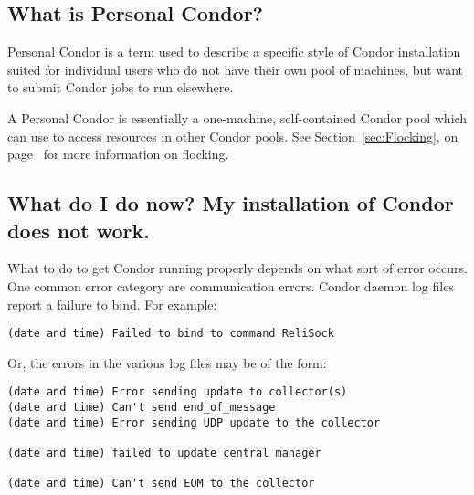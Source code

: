 %

\subsection*{What is Personal Condor?}

Personal Condor is a term used to describe a specific style of Condor
installation suited for individual users who do not have their own
pool of machines, but want to submit Condor jobs to run elsewhere.

A Personal Condor is essentially a one-machine, self-contained Condor
pool which can use  to access resources in other Condor
pools.
See Section~\ref{sec:Flocking}, on page~\pageref{sec:Flocking} for
more information on flocking.


\subsection*{What do I do now? My installation of Condor does not work.}

What to do to get Condor running properly depends on what sort of
error occurs. 
One common error category are communication errors.
Condor daemon log files report a failure to bind.
For example:

\begin{verbatim}
(date and time) Failed to bind to command ReliSock
\end{verbatim}

Or, the errors in the various log files may be of the form:

\begin{verbatim}
(date and time) Error sending update to collector(s)
(date and time) Can't send end_of_message
(date and time) Error sending UDP update to the collector

(date and time) failed to update central manager

(date and time) Can't send EOM to the collector
\end{verbatim}

